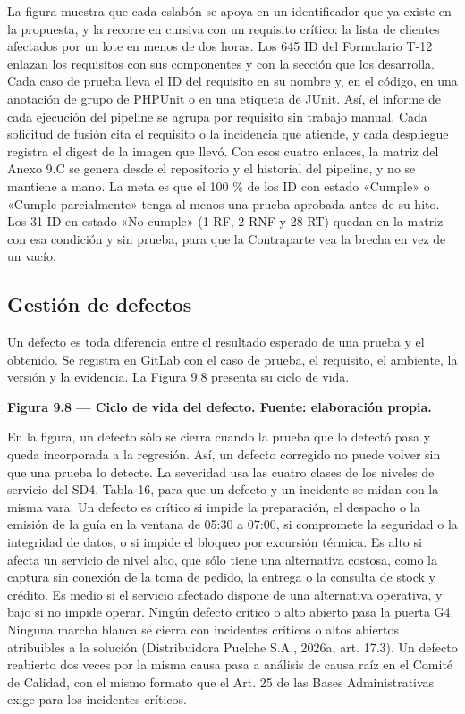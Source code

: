 La figura muestra que cada eslabón se apoya en un identificador que ya existe en la propuesta, y la recorre en cursiva con un requisito crítico: la lista de clientes afectados por un lote en menos de dos horas. Los 645 ID del Formulario T-12 enlazan los requisitos con sus componentes y con la sección que los desarrolla. Cada caso de prueba lleva el ID del requisito en su nombre y, en el código, en una anotación de grupo de PHPUnit o en una etiqueta de JUnit. Así, el informe de cada ejecución del pipeline se agrupa por requisito sin trabajo manual. Cada solicitud de fusión cita el requisito o la incidencia que atiende, y cada despliegue registra el digest de la imagen que llevó. Con esos cuatro enlaces, la matriz del Anexo 9.C se genera desde el repositorio y el historial del pipeline, y no se mantiene a mano. La meta es que el 100 \% de los ID con estado «Cumple» o «Cumple parcialmente» tenga al menos una prueba aprobada antes de su hito. Los 31 ID en estado «No cumple» (1 RF, 2 RNF y 28 RT) quedan en la matriz con esa condición y sin prueba, para que la Contraparte vea la brecha en vez de un vacío.

\subsection{Gestión de defectos}

Un defecto es toda diferencia entre el resultado esperado de una prueba y el obtenido. Se registra en GitLab con el caso de prueba, el requisito, el ambiente, la versión y la evidencia. La Figura 9.8 presenta su ciclo de vida.



\textbf{Figura 9.8 — Ciclo de vida del defecto. Fuente: elaboración propia.}

En la figura, un defecto sólo se cierra cuando la prueba que lo detectó pasa y queda incorporada a la regresión. Así, un defecto corregido no puede volver sin que una prueba lo detecte. La severidad usa las cuatro clases de los niveles de servicio del SD4, Tabla 16, para que un defecto y un incidente se midan con la misma vara. Un defecto es crítico si impide la preparación, el despacho o la emisión de la guía en la ventana de 05:30 a 07:00, si compromete la seguridad o la integridad de datos, o si impide el bloqueo por excursión térmica. Es alto si afecta un servicio de nivel alto, que sólo tiene una alternativa costosa, como la captura sin conexión de la toma de pedido, la entrega o la consulta de stock y crédito. Es medio si el servicio afectado dispone de una alternativa operativa, y bajo si no impide operar. Ningún defecto crítico o alto abierto pasa la puerta G4. Ninguna marcha blanca se cierra con incidentes críticos o altos abiertos atribuibles a la solución (Distribuidora Puelche S.A., 2026a, art. 17.3). Un defecto reabierto dos veces por la misma causa pasa a análisis de causa raíz en el Comité de Calidad, con el mismo formato que el Art. 25 de las Bases Administrativas exige para los incidentes críticos.

